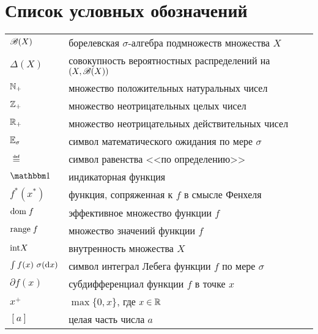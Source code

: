 \chapter*{Список условных обозначений}             %



\begin{tabular}{p{3.5cm}p{12.0cm}}
  $\mathscr{B}(X)$ & борелевская $\sigma$-алгебра подмножеств множества $X$ \\
  $\Delta(X)$ & совокупность вероятностных распределений на~$(X, \mathscr{B}(X))$ \\
  $\mathbb{N}_+$ & множество положительных натуральных чисел \\
  $\mathbb{Z}_+$ & множество неотрицательных целых чисел \\
  $\mathbb{R}_+$ & множество неотрицательных действительных чисел \\
  $\operatorname{\mathbb{E}}_\sigma$ & символ математического ожидания по мере $\sigma$ \\
  $\eqdef$ & символ равенства <<по определению>> \\
  $\Ind{ }$ & индикаторная функция \\
  $f^*(x^*)$ & функция, сопряженная к $f$ в смысле Фенхеля \\
  $\mathrm{dom\;} f$ & эффективное множество функции $f$ \\
  $\mathrm{range\;} f$ & множество значений функции $f$ \\
  $\mathrm{int} X$ & внутренность множества $X$ \\
  $\int f(x)\ \sigma(\di x)$ & символ интеграл Лебега функции $f$ по мере $\sigma$ \\
  $\partial f(x)$ & субдифференциал функции $f$ в точке $x$ \\
  $x^+$ & $\max\{0, x\}$, где $x \in \mathbb{R}$ \\
  $[a]$ & целая часть числа $a$ \\
\end{tabular}

